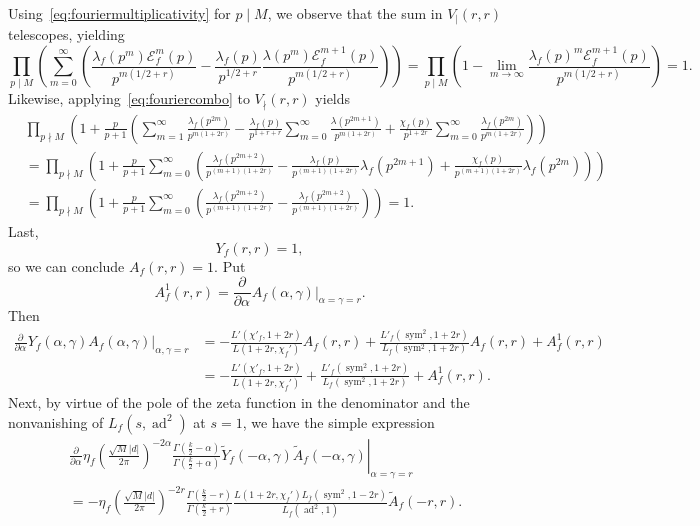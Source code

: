 \documentclass[11pt,reqno]{amsart} \usepackage{fullpage}
\newcommand{\ra}{\rightarrow}
\newcommand{\pp}[2][]{\frac{\partial^{#1}}{\partial {#2}^{#1}}}
\newcommand\be{\begin{equation}}
\newcommand\ee{\end{equation}}
\newcommand{\Lad}[1]{L_f\left(#1,\ad^2\right)}
\newcommand{\Lchi}[2][]{L(#2,\chi_f#1)}
\DeclareMathOperator{\sym}{sym}
\DeclareMathOperator{\ad}{ad}
\newcommand{\E}{\mathcal E_f}
\numberwithin{equation}{section}
\begin{document}
Using~\eqref{eq:fouriermultiplicativity} for $p\mid M$,
we observe that the sum in $V_\mid(r,r)$ telescopes, yielding
\be\label{eq:euler1eq1}
\prod_{p\mid M}
  \left(
    \sum_{m=0}^\infty\left(
      \frac{\lambda_f(p^{m})\E^{m}(p)}{p^{m(1/2+r)}}
      -\frac{\lambda_f(p)}{p^{1/2+r}}
      \frac{\lambda(p^{m})\E^{m+1}(p)}
      {p^{m(1/2+r)}}
    \right)
  \right)
  = \prod_{p\mid M}
  \left(1-\lim_{m\ra\infty}\frac{\lambda_f(p)^m\E^{m+1}(p)}
  {p^{m(1/2+r)}}\right) = 1.
\ee
Likewise, applying~\eqref{eq:fouriercombo} to $V_\nmid(r,r)$ yields
\be\label{eq:euler2eq1}\begin{aligned}
  &\prod_{p\nmid M}
  \left(1+\frac p{p+1}\left(
      \sum_{m=1}^\infty
      \frac{\lambda_f(p^{2m})}{p^{m(1+2r)}}
      -\frac{\lambda_f(p)}{p^{1+r+r}}
      \sum_{m=0}^\infty
      \frac{\lambda(p^{2m+1})}{p^{m(1+2r)}}
      +\frac{\chi_f(p)}{p^{1+2r}}
      \sum_{m=0}^\infty
      \frac{\lambda_f(p^{2m})}{p^{m(1+2r)}}
    \right)
  \right) \\
  &=\prod_{p\nmid M}\left(1+\frac p{p+1}
    \sum_{m=0}^\infty\left(\frac{\lambda_f(p^{2m+2})}{p^{(m+1)(1+2r)}}
      -\frac{\lambda_f(p)}{p^{(m+1)(1+2r)}}\lambda_f(p^{2m+1})
      +\frac{\chi_f(p)}{p^{(m+1)(1+2r)}}\lambda_f(p^{2m})
    \right)\right) \\
  &=\prod_{p\nmid M}\left(1+\frac p{p+1}
    \sum_{m=0}^\infty\left(\frac{\lambda_f(p^{2m+2})}{p^{(m+1)(1+2r)}}
      -\frac{\lambda_f(p^{2m+2})}{p^{(m+1)(1+2r)}}
    \right)\right) = 1.
\end{aligned}\ee
Last,
\be Y_f(r,r) = 1, \ee
so we can conclude $A_f(r,r)=1$. Put
\be\label{eq:A1fdef}
A_f^1(r,r)=\pp\alpha\left.A_f(\alpha,\gamma)\right|_{\alpha=\gamma=r}.
\ee
Then
\begin{align}
  \pp\alpha\left.Y_f(\alpha,\gamma)A_f(\alpha,\gamma)\right|_{\alpha,\gamma=r}
  &=-\frac{L'\left(\chi'_f,1+2r\right)}{\Lchi[']{1+2r}}A_f(r,r)
  +\frac{L'_f(\sym^2,1+2r)}{L_f(\sym^2,1+2r)}A_f(r,r)+A_f^1(r,r) \\
  &=-\frac{L'\left(\chi'_f,1+2r\right)}{\Lchi[']{1+2r}}
  +\frac{L'_f(\sym^2,1+2r)}{L_f(\sym^2,1+2r)}+A_f^1(r,r).
\end{align}
Next, by virtue of the pole of the zeta function in the denominator and the
nonvanishing of $\Lad{s}$ at $s=1$, we have the simple expression
\be\begin{aligned}
  &\pp\alpha\left.
    \eta_f\left(\frac{\sqrt M |d|}{2\pi}\right)^{-2\alpha}
    \frac{\Gamma\left(\frac k2-\alpha\right)}{\Gamma\left(\frac k2+\alpha\right)}
    \tilde{Y}_f(-\alpha,\gamma)\tilde{A}_f(-\alpha,\gamma)\right|_{\alpha=\gamma=r} \\
  &=-\eta_f\left(\frac{\sqrt M |d|}{2\pi}\right)^{-2r}
  \frac{\Gamma\left(\frac k2-r\right)}{\Gamma\left(\frac k2+r\right)}
  \frac{\Lchi[']{1+2r}L_{\overline f}(\sym^2,1-2r)}
  {L_f(\ad^2,1)}\tilde{A}_f(-r,r).
\end{aligned}\ee
\end{document}
